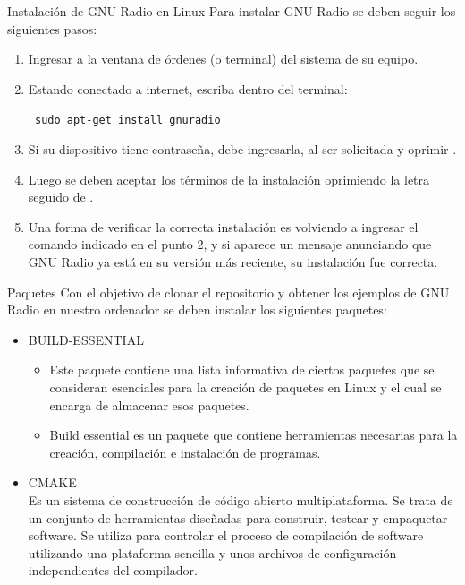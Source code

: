 \begin{frame}{Instalación de GNU Radio en Linux}
{Para instalar GNU Radio se deben seguir los siguientes pasos:}
\begin{enumerate}[1.]
\item Ingresar a la ventana de órdenes (o terminal) del sistema de su equipo.
\item Estando conectado a internet, escriba dentro del terminal:

  \begin{block}{}
  \texttt{
    sudo apt-get install gnuradio}
  \end{block}

\item Si su dispositivo tiene contrase\~na, debe ingresarla, al ser solicitada y oprimir \keys{\return}. 
\item Luego se deben aceptar los términos de la instalación oprimiendo la letra  seguido de \keys{\return}. 
\item Una forma de verificar la correcta instalación es volviendo a ingresar el comando indicado en el punto 2, y si aparece un mensaje anunciando que GNU Radio ya está en su versión más reciente, su instalación fue correcta.
\end{enumerate}
\end{frame}


\begin{frame}{Paquetes}
Con el objetivo de clonar el repositorio y obtener los ejemplos de GNU Radio en nuestro ordenador se deben instalar los siguientes paquetes: 
  \begin{itemize}
  \item {BUILD-ESSENTIAL\\}
    \begin{itemize}
    \item
    {Este paquete contiene una lista informativa de ciertos paquetes que se consideran esenciales para la creación de paquetes en Linux y el cual se encarga de almacenar esos paquetes.}
    \item
    {Build essential es un paquete que contiene herramientas necesarias
    para la creación, compilación e instalación de programas.}
    \end{itemize}
  \item {CMAKE\\}
  {Es un sistema de construcción de código abierto multiplataforma. Se trata de  un conjunto de herramientas diseñadas para construir, testear y empaquetar software. Se utiliza para controlar el proceso de compilación de software utilizando una plataforma sencilla y unos archivos de configuración
independientes del compilador.}
  \end{itemize}
\end{frame}


